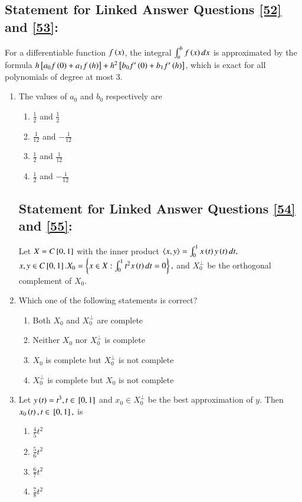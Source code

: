 \documentclass[journal]{IEEEtran}
\begin{document}
\subsection*{Statement for Linked Answer Questions \ref{52} and \ref{53}:}
    For a differentiable function $f\left(x\right)$, the integral $\int_{a}^{b} f\left(x\right)dx $ is approximated by the formula $h{}\left[ a_0 f\left(0\right) + a_1 f\left(h\right)\right] + h^2 {}\left[b_0 f^{\prime}\left(0\right) + b_1 f^{\prime}\left(h\right)\right]$, which is exact for all polynomials of degree at most $3$.
\begin{enumerate}


    \item \label{53}  The values of $a_0$ and $b_0$ respectively are 
        \begin{enumerate}
            \item $\frac{1}{2}$ and $\frac{1}{2}$
            \item $\frac{1}{12}$ and $-\frac{1}{12}$
            \item $\frac{1}{2}$ and $\frac{1}{12}$
            \item $\frac{1}{2}$ and $-\frac{1}{12}$
        \end{enumerate}

    \subsection*{Statement for Linked Answer Questions \ref{54} and \ref{55}:}
    Let $X = C{}\left[0,1\right]$ with the inner product $\langle x,y \rangle = \int_{0}^{1} x\left(t\right) y\left(t\right) dt,$ $x,y \in C{}\left[0,1\right]. X_0 = \left\{ x \in X : 
    \int_0^1 t^2 x \left(t\right) dt = 0\right\},$ and $X_0^{\perp}$ be the orthogonal complement of $X_0$.

    \item \label{54} Which one of the following statements is correct?
        \begin{enumerate}
            \item Both $X_0$ and $X_0^{\perp}$ are complete
            \item Neither $X_0$ nor $X_0^{\perp}$ is complete
            \item $X_0$ is complete but $X_0^{\perp}$ is not complete
            \item $X_0^{\perp}$ is complete but $X_0$ is not complete
        \end{enumerate}

    \item \label{55} Let $y\left(t\right) = t^3, t \in {}\left[0,1\right]$ and $x_0 \in X_0^{\perp}$ be the best approximation of $y$. Then $x_0\left(t\right), t \in {}\left[0,1\right],$ is
        \begin{enumerate}
            \item $\frac{4}{5} t^2$
            \item $\frac{5}{6} t^2$
            \item $\frac{6}{7} t^2$
            \item $\frac{7}{8} t^2$
        \end{enumerate}


\end{enumerate}
\end{document}
